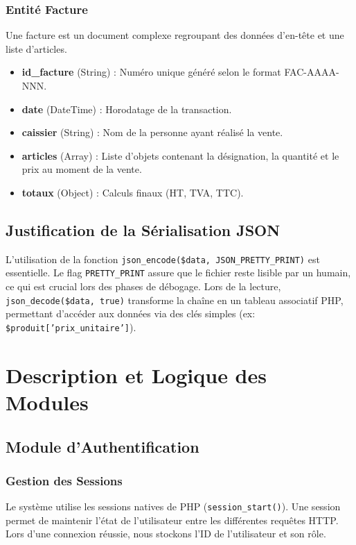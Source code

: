 \documentclass[12pt,a4paper]{report}
\begin{document}
\subsection{Entité Facture}
Une facture est un document complexe regroupant des données d'en-tête et une liste d'articles.
\begin{itemize}
    \item \textbf{id\_facture} (String) : Numéro unique généré selon le format FAC-AAAA-NNN.
    \item \textbf{date} (DateTime) : Horodatage de la transaction.
    \item \textbf{caissier} (String) : Nom de la personne ayant réalisé la vente.
    \item \textbf{articles} (Array) : Liste d'objets contenant la désignation, la quantité et le prix au moment de la vente.
    \item \textbf{totaux} (Object) : Calculs finaux (HT, TVA, TTC).
\end{itemize}

\section{Justification de la Sérialisation JSON}
L'utilisation de la fonction \texttt{json\_encode(\$data, JSON\_PRETTY\_PRINT)} est essentielle. Le flag \texttt{PRETTY\_PRINT} assure que le fichier reste lisible par un humain, ce qui est crucial lors des phases de débogage. Lors de la lecture, \texttt{json\_decode(\$data, true)} transforme la chaîne en un tableau associatif PHP, permettant d'accéder aux données via des clés simples (ex: \texttt{\$produit['prix\_unitaire']}).

\chapter{Description et Logique des Modules}
\section{Module d'Authentification}
\subsection{Gestion des Sessions}
Le système utilise les sessions natives de PHP (\texttt{session\_start()}). Une session permet de maintenir l'état de l'utilisateur entre les différentes requêtes HTTP. Lors d'une connexion réussie, nous stockons l'ID de l'utilisateur et son rôle.
\end{document}
